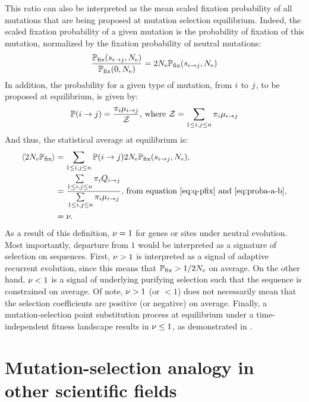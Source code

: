 This ratio can also be interpreted as the mean scaled fixation probability of all mutations that are being proposed at mutation selection equilibrium.
Indeed, the scaled fixation probability of a given mutation is the probability of fixation of this mutation, normalized by the fixation probability of \gls{neutral} mutations:
\begin{align}
    \dfrac{\mathbb{P}_{\text{fix}} (s_{{i} \to {j}}, N_{\text{e}})}{\mathbb{P}_{\text{fix}} (0, N_{\text{e}})} = 2 N_{\text{e}} \mathbb{P}_{\text{fix}} (s_{{i} \to {j}}, N_{\text{e}})
\end{align}
In addition, the probability for a given type of mutation, from ${i}$ to ${j}$, to be proposed at equilibrium, is given by:
\begin{align}
    \mathbb{P} ({i} \to {j}) = \dfrac{\pi_{{i}}  \mu_{{i} \to {j}}}{ \mathcal{Z}} \text{, where } \mathcal{Z} = \sum\limits_{1 \leq {i}, {j} \leq n} \pi_{{i}} \mu_{{i} \to {j}} \label{eq:proba-a-b}
\end{align}
And thus, the statistical average at equilibrium is:
\begin{align}
    \left\langle 2 N_{\text{e}} \mathbb{P}_{\text{fix}} \right\rangle & = \sum\limits_{1 \leq {i}, {j} \leq n}  \mathbb{P} ({i} \to {j}) 2 N_{\text{e}} \mathbb{P}_{\text{fix}} (s_{{i} \to {j}}, N_{\text{e}}), \\
    & = \dfrac{ \sum\limits_{1 \leq {i}, {j} \leq n} \pi_{{i}} Q_{{i} \to {j}}}{\sum\limits_{1 \leq {i}, {j} \leq n} \pi_{{i}} \mu_{{i} \to {j}}} \text{, from equation~\ref{eq:q-pfix} and~\ref{eq:proba-a-b}}, \\
    & = \nu.
\end{align}
As a result of this definition, $\nu=1$ for genes or sites under \gls{neutral} evolution.
Most importantly, departure from $1$ would be interpreted as a signature of selection on sequences.
First, $\nu>1$ is interpreted as a signal of adaptive recurrent evolution, since this means that $\mathbb{P}_{\text{fix}} > 1/2 N_{\text{e}}$ on average.
On the other hand, $\nu<1$ is a signal of underlying purifying selection such that the sequence is constrained on average.
Of note, $ \nu > 1$ (or $ < 1$) does not necessarily mean that the selection coefficients are positive (or negative) on average.
Finally, a mutation-selection point \gls{substitution} process at equilibrium under a time-independent fitness landscape results in $\nu \leq 1$, as demonstrated in \citet{Spielman2015}.


\section{Mutation-selection analogy in other scientific fields}

